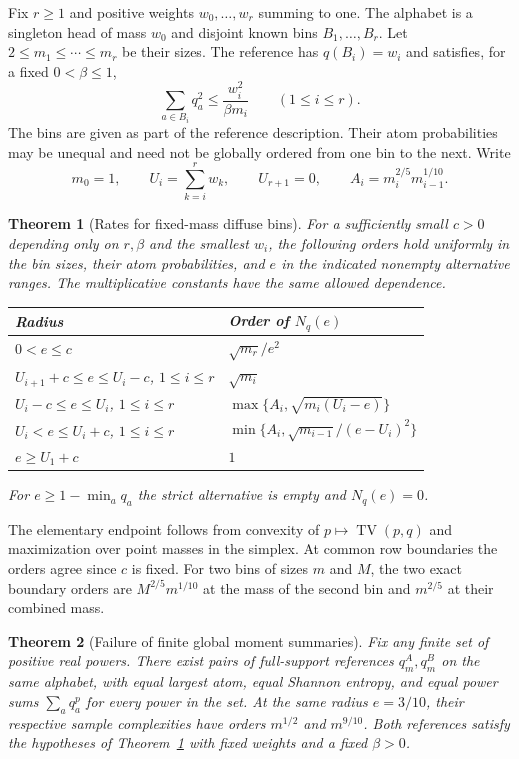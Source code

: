\documentclass[11pt]{article}
\newtheorem{theorem}{Theorem}
\newcommand{\TV}{\operatorname{TV}}
\begin{document}
Fix \(r\ge1\) and positive weights \(w_0,\ldots,w_r\) summing to one. The alphabet is a singleton head of mass \(w_0\) and disjoint known bins \(B_1,\ldots,B_r\). Let \(2\le m_1\le\cdots\le m_r\) be their sizes. The reference has \(q(B_i)=w_i\) and satisfies, for a fixed \(0<\beta\le1\),
\begin{equation}\label{eq:diffuse}
 \sum_{a\in B_i} q_a^2\le \frac{w_i^2}{\beta m_i}\qquad(1\le i\le r).
\end{equation}
The bins are given as part of the reference description. Their atom probabilities may be unequal and need not be globally ordered from one bin to the next. Write
\[
  m_0=1,\qquad U_i=\sum_{k=i}^{r}w_k,\qquad U_{r+1}=0,\qquad
  A_i=m_i^{2/5}m_{i-1}^{1/10}.
\]

\begin{theorem}[Rates for fixed-mass diffuse bins]\label{thm:rates}
For a sufficiently small \(c>0\) depending only on \(r,\beta\) and the smallest \(w_i\), the following orders hold uniformly in the bin sizes, their atom probabilities, and \(e\) in the indicated nonempty alternative ranges. The multiplicative constants have the same allowed dependence.
\begin{center}
\begin{tabular}{@{}ll@{}}
\toprule
Radius & Order of \(N_q(e)\) \\
\midrule
\(0<e\le c\) & \(\sqrt{m_r}/e^2\) \\
\(U_{i+1}+c\le e\le U_i-c\), \(1\le i\le r\) & \(\sqrt{m_i}\) \\
\(U_i-c\le e\le U_i\), \(1\le i\le r\) & \(\max\{A_i,\sqrt{m_i(U_i-e)}\}\) \\
\(U_i<e\le U_i+c\), \(1\le i\le r\) & \(\min\{A_i,\sqrt{m_{i-1}}/(e-U_i)^2\}\) \\
\(e\ge U_1+c\) & \(1\) \\
\bottomrule
\end{tabular}
\end{center}
For \(e\ge1-\min_a q_a\) the strict alternative is empty and \(N_q(e)=0\).
\end{theorem}

The elementary endpoint follows from convexity of \(p\mapsto\TV(p,q)\) and maximization over point masses in the simplex. At common row boundaries the orders agree since \(c\) is fixed. For two bins of sizes \(m\) and \(M\), the two exact boundary orders are \(M^{2/5}m^{1/10}\) at the mass of the second bin and \(m^{2/5}\) at their combined mass.

\begin{theorem}[Failure of finite global moment summaries]\label{thm:moments}
Fix any finite set of positive real powers. There exist pairs of full-support references \(q^A_m,q^B_m\) on the same alphabet, with equal largest atom, equal Shannon entropy, and equal power sums \(\sum_a q_a^p\) for every power in the set. At the same radius \(e=3/10\), their respective sample complexities have orders \(m^{1/2}\) and \(m^{9/10}\). Both references satisfy the hypotheses of Theorem~\ref{thm:rates} with fixed weights and a fixed \(\beta>0\).
\end{theorem}
\end{document}
